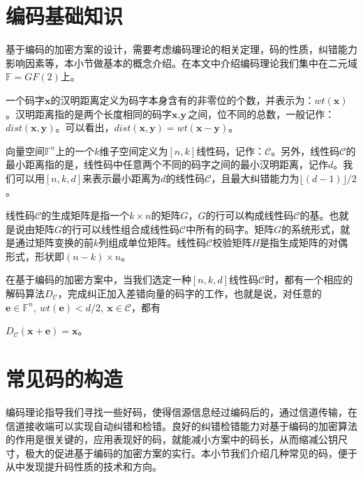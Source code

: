 \section{编码基础知识}
基于编码的加密方案的设计，需要考虑编码理论的相关定理，码的性质，纠错能力影响因素等，本小节做基本的概念介绍。在本文中介绍编码理论我们集中在二元域$\mathbb{F} = GF(2)$上。

\begin{define}[汉明重量与汉明距离]
	一个码字$\textbf{x}$的汉明距离定义为码字本身含有的非零位的个数，并表示为：$wt(\textbf{x})$。汉明距离指的是两个长度相同的码字$\textbf{x}, \textbf{y}$之间，位不同的总数，一般记作：$dist(\textbf{x}, \textbf{y})$。可以看出，$dist(\textbf{x}, \textbf{y}) = wt(\textbf{x} - \textbf{y})$。
\end{define}

\begin{define}[线性码]
	向量空间$\mathbb{F}^n$上的一个$k$维子空间定义为$[n, k]$线性码，记作：$\mathcal{C}$。另外，线性码$\mathcal{C}$的最小距离指的是，线性码中任意两个不同的码字之间的最小汉明距离，记作$d$。我们可以用$[n, k, d]$来表示最小距离为$d$的线性码$\mathcal{C}$，且最大纠错能力为$\lfloor(d - 1)\rfloor/2$。
\end{define}

\begin{define}[生成矩阵与校验矩阵]
	线性码$\mathcal{C}$的生成矩阵是指一个$k \times n$的矩阵$G$，$G$的行可以构成线性码$\mathcal{C}$的基。也就是说由矩阵$G$的行可以线性组合成线性码$\mathcal{C}$中所有的码字。矩阵$G$的系统形式，就是通过矩阵变换的前$k$列组成单位矩阵。线性码$\mathcal{C}$校验矩阵$H$是指生成矩阵的对偶形式，形状即$(n - k) \times n$。	
\end{define}

\begin{define}[解码算法]
	在基于编码的加密方案中，当我们选定一种$[n,k,d]$线性码$\mathcal{C}$时，都有一个相应的解码算法$D_{\mathcal{C}}$，完成纠正加入差错向量的码字的工作，也就是说，对任意的$\textbf{e} \in \mathbb{F}^n,~wt(\textbf{e}) < d/2,~\textbf{x} \in \mathcal{C}$，都有
	
	\centering $D_{\mathcal{C}}(\textbf{x} + \textbf{e}) = \textbf{x}$。
\end{define}

\section{常见码的构造}
编码理论指导我们寻找一些好码，使得信源信息经过编码后的，通过信道传输，在信道接收端可以实现自动纠错和检错。良好的纠错检错能力对基于编码的加密算法的作用是很关键的，应用表现好的码，就能减小方案中的码长，从而缩减公钥尺寸，极大的促进基于编码的加密方案的实行。本小节我们介绍几种常见的码，便于从中发现提升码性质的技术和方向。

